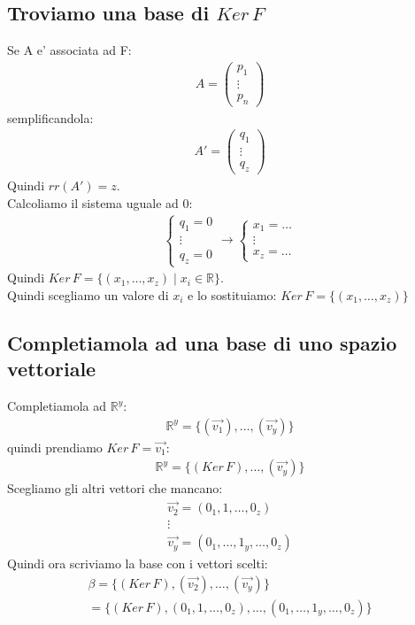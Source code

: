 \documentclass{article}
\begin{document}
\subsection{Troviamo una base di $Ker \, F$}
Se A e' associata ad F:
\begin{align*}
    A=\begin{pmatrix}
        p_1 \\
        \vdots \\
        p_n
    \end{pmatrix}
\end{align*}
semplificandola:
\begin{align*}
    A'=\begin{pmatrix}
        q_1 \\
        \vdots \\
        q_z
    \end{pmatrix}
\end{align*}
Quindi $rr(A')=z$. \\
Calcoliamo il sistema uguale ad 0:
\begin{align*}
    \begin{cases}
        q_1=0 \\
        \vdots \\
        q_z=0
    \end{cases}
    \to 
    \begin{cases}
        x_1= \dots \\
        \vdots \\
        x_z= \dots
    \end{cases}
\end{align*}
Quindi $Ker \, F=\{(x_1,\dots,x_z) \mid x_i \in \mathbb{R}\}$. \\
Quindi scegliamo un valore di $x_i$ e lo sostituiamo: $Ker \, F=\{(x_1,\dots,x_z)\}$
\subsection{Completiamola ad una base di uno spazio vettoriale}
Completiamola ad $\mathbb{R}^y$: \\
\begin{align*}
    \mathbb{R}^y=\{(\vec{v_1}),\dots,(\vec{v_y})\}
\end{align*}
quindi prendiamo $Ker \, F=\vec{v_1}$:
\begin{align*}
    \mathbb{R}^y=\{(Ker \, F),\dots,(\vec{v_y})\}
\end{align*}
Scegliamo gli altri vettori che mancano:
\begin{align*}
    \vec{v_2}=(0_1,1,\dots,0_z) \\
    \vdots \\
    \vec{v_y}=(0_1,\dots,1_y,\dots,0_z)
\end{align*}
Quindi ora scriviamo la base con i vettori scelti:
\begin{align*}
    \beta=\{(Ker \, F),(\vec{v_2}),\dots,(\vec{v_y})\} \\
    =\{(Ker \, F),(0_1,1,\dots,0_z),\dots,(0_1,\dots,1_y,\dots,0_z)\}
\end{align*}
\end{document}
